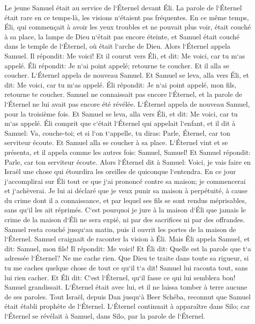 \verse Le jeune Samuel était au service de l`Éternel devant Éli. La parole de l`Éternel était rare en ce temps-là, les visions n`étaient pas fréquentes. 
\verse En ce même temps, Éli, qui commençait à avoir les yeux troubles et ne pouvait plus voir, était couché à sa place, 
\verse la lampe de Dieu n`était pas encore éteinte, et Samuel était couché dans le temple de l`Éternel, où était l`arche de Dieu. 
\verse Alors l`Éternel appela Samuel. Il répondit: Me voici! 
\verse Et il courut vers Éli, et dit: Me voici, car tu m`as appelé. Éli répondit: Je n`ai point appelé; retourne te coucher. Et il alla se coucher. 
\verse L`Éternel appela de nouveau Samuel. Et Samuel se leva, alla vers Éli, et dit: Me voici, car tu m`as appelé. Éli répondit: Je n`ai point appelé, mon fils, retourne te coucher. 
\verse Samuel ne connaissait pas encore l`Éternel, et la parole de l`Éternel ne lui avait pas encore été révélée. 
\verse L`Éternel appela de nouveau Samuel, pour la troisième fois. Et Samuel se leva, alla vers Éli, et dit: Me voici, car tu m`as appelé. Éli comprit que c`était l`Éternel qui appelait l`enfant, 
\verse et il dit à Samuel: Va, couche-toi; et si l`on t`appelle, tu diras: Parle, Éternel, car ton serviteur écoute. Et Samuel alla se coucher à sa place. 
\verse L`Éternel vint et se présenta, et il appela comme les autres fois: Samuel, Samuel! Et Samuel répondit: Parle, car ton serviteur écoute. 
\verse Alors l`Éternel dit à Samuel: Voici, je vais faire en Israël une chose qui étourdira les oreilles de quiconque l`entendra. 
\verse En ce jour j`accomplirai sur Éli tout ce que j`ai prononcé contre sa maison; je commencerai et j`achèverai. 
\verse Je lui ai déclaré que je veux punir sa maison à perpétuité, à cause du crime dont il a connaissance, et par lequel ses fils se sont rendus méprisables, sans qu`il les ait réprimés. 
\verse C`est pourquoi je jure à la maison d`Éli que jamais le crime de la maison d`Éli ne sera expié, ni par des sacrifices ni par des offrandes. 
\verse Samuel resta couché jusqu`au matin, puis il ouvrit les portes de la maison de l`Éternel. Samuel craignait de raconter la vision à Éli. 
\verse Mais Éli appela Samuel, et dit: Samuel, mon fils! Il répondit: Me voici! 
\verse Et Éli dit: Quelle est la parole que t`a adressée l`Éternel? Ne me cache rien. Que Dieu te traite dans toute sa rigueur, si tu me caches quelque chose de tout ce qu`il t`a dit! 
\verse Samuel lui raconta tout, sans lui rien cacher. Et Éli dit: C`est l`Éternel, qu`il fasse ce qui lui semblera bon! 
\verse Samuel grandissait. L`Éternel était avec lui, et il ne laissa tomber à terre aucune de ses paroles. 
\verse Tout Israël, depuis Dan jusqu`à Beer Schéba, reconnut que Samuel était établi prophète de l`Éternel. 
\verse L`Éternel continuait à apparaître dans Silo; car l`Éternel se révélait à Samuel, dans Silo, par la parole de l`Éternel. 

